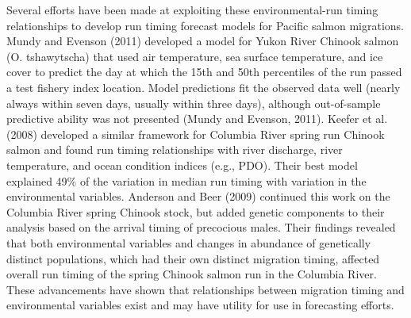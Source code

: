 \documentclass[12pt,]{book}
\theoremstyle{definition}
\theoremstyle{definition}
\theoremstyle{definition}
\theoremstyle{remark}
\begin{document}
Several efforts have been made at exploiting these environmental-run
timing relationships to develop run timing forecast models for Pacific
salmon migrations. Mundy and Evenson (2011) developed a model for Yukon
River Chinook salmon (O. tshawytscha) that used air temperature, sea
surface temperature, and ice cover to predict the day at which the 15th
and 50th percentiles of the run passed a test fishery index location.
Model predictions fit the observed data well (nearly always within seven
days, usually within three days), although out-of-sample predictive
ability was not presented (Mundy and Evenson, 2011). Keefer et al.
(2008) developed a similar framework for Columbia River spring run
Chinook salmon and found run timing relationships with river discharge,
river temperature, and ocean condition indices (e.g., PDO). Their best
model explained 49\% of the variation in median run timing with
variation in the environmental variables. Anderson and Beer (2009)
continued this work on the Columbia River spring Chinook stock, but
added genetic components to their analysis based on the arrival timing
of precocious males. Their findings revealed that both environmental
variables and changes in abundance of genetically distinct populations,
which had their own distinct migration timing, affected overall run
timing of the spring Chinook salmon run in the Columbia River. These
advancements have shown that relationships between migration timing and
environmental variables exist and may have utility for use in
forecasting efforts.
\end{document}

